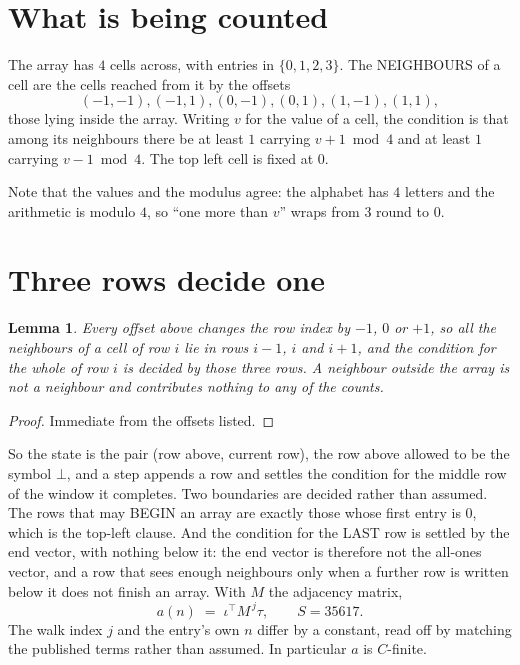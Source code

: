 \documentclass[11pt,a4paper]{article}
\theoremstyle{plain}
\newtheorem{lemma}[theorem]{Lemma}
\theoremstyle{definition}
\begin{document}
\section{What is being counted}

The array has $4$ cells across, with entries in $\{0,1,2,3\}$. The NEIGHBOURS of a cell are the
cells reached from it by the offsets
\[
(-1,-1), (-1,1), (0,-1), (0,1), (1,-1), (1,1),
\]
those lying inside the array. Writing $v$ for the value of a cell, the condition is that among
its neighbours there be at least $1$ carrying $v+1 \bmod 4$ and at least $1$ carrying $v-1 \bmod 4$. The top left
cell is fixed at $0$.

Note that the values and the modulus agree: the alphabet has $4$ letters and the arithmetic
is modulo $4$, so ``one more than $v$'' wraps from $3$ round to $0$.

\section{Three rows decide one}

\begin{lemma}\label{lem:win}
Every offset above changes the row index by $-1$, $0$ or $+1$, so all the neighbours of a cell
of row $i$ lie in rows $i-1$, $i$ and $i+1$, and the condition for the whole of row $i$ is
decided by those three rows. A neighbour outside the array is not a neighbour and contributes
nothing to any of the counts.
\end{lemma}

\begin{proof}
Immediate from the offsets listed.
\end{proof}

So the state is the pair (row above, current row), the row above allowed to be the symbol
$\bot$, and a step appends a row and settles the condition for the middle row of the window it
completes. Two boundaries are decided rather than assumed. The rows that may BEGIN an array are
exactly those whose first entry is $0$, which is the top-left clause. And the condition for the
LAST row is settled by the end vector, with nothing below it: the end vector is therefore not
the all-ones vector, and a row that sees enough neighbours only when a further row is written
below it does not finish an array. With $M$ the adjacency matrix,
\[
a(n)\;=\;\iota^{\!\top}M^{\,j}\tau ,\qquad S=35617.
\]
The walk index $j$ and the entry's own $n$ differ by a constant, read off by matching the
published terms rather than assumed. In particular $a$ is $C$-finite.
\end{document}
